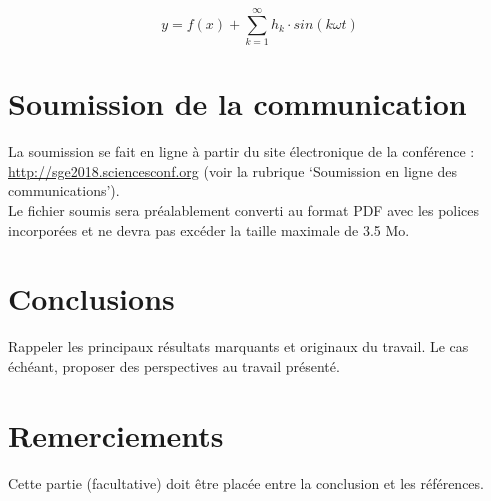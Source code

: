 \documentclass[a4paper,10pt,twocolumn]{article}
\begin{document}
\begin{equation}
	y = f(x) + \sum_{k=1}^{\infty} h_k \cdot sin(k \omega t)
	\label{eq_1}
\end{equation}


\section{Soumission de la communication}

La soumission se fait en ligne à partir du site électronique de la conférence : \url{http://sge2018.sciencesconf.org} (voir la rubrique ‘Soumission en ligne des communications’).\\

Le fichier soumis sera préalablement converti au format PDF avec les polices incorporées et ne devra pas excéder la taille maximale de 3.5 Mo.


\section{Conclusions}

Rappeler les principaux résultats marquants et originaux du travail. Le cas échéant, proposer des perspectives au travail présenté.


\section{Remerciements}

Cette partie (facultative) doit être placée entre la conclusion et les références.




\end{document}
